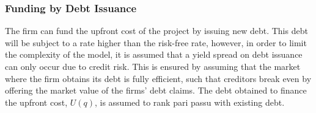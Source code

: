 \documentclass[../main.tex]{subfiles}
\begin{document}
    \subsubsection{Funding by Debt Issuance}
        \label{sec:marginal-valuation-debt-issuance}
        The firm can fund the upfront cost of the project by issuing new debt.
        This debt will be subject to a rate higher than the risk-free rate, 
        however, in order to limit the complexity of the model, 
        it is assumed that a yield spread on debt issuance can only occur due to credit risk. 
        This is ensured by assuming that the market where the firm obtains its debt is fully efficient, 
        such that creditors break even by offering the market value of the firms' debt claims.
        The debt obtained to finance the upfront cost, $U(q)$, is assumed to rank pari passu with existing debt.
\end{document}
